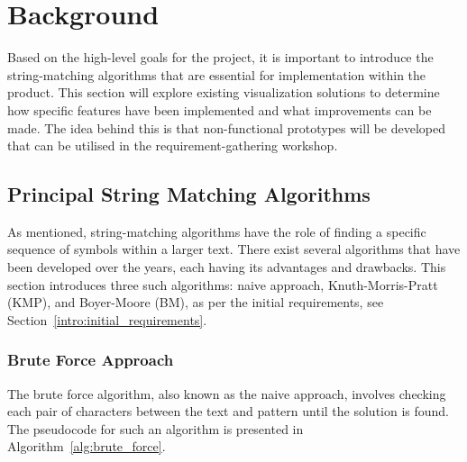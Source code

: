 \chapter{Background}

Based on the high-level goals for the project, it is important to introduce the string-matching algorithms that are essential for implementation within the product. This section will explore existing visualization solutions to determine how specific features have been implemented and what improvements can be made. The idea behind this is that non-functional prototypes will be developed that can be utilised in the requirement-gathering workshop.

\section{Principal String Matching Algorithms}
\label{bac:algorithms}

As mentioned, string-matching algorithms have the role of finding a specific sequence of symbols within a larger text. There exist several algorithms that have been developed over the years, each having its advantages and drawbacks. This section introduces three such algorithms: naive approach, Knuth-Morris-Pratt (KMP), and Boyer-Moore (BM), as per the initial requirements, see Section~\ref{intro:initial_requirements}.


\subsection{Brute Force Approach}
\label{bac:brute-force}

The brute force algorithm, also known as the naive approach, involves checking each pair of characters between the text and pattern until the solution is found. The pseudocode for such an algorithm is presented in Algorithm~\ref{alg:brute_force}.

